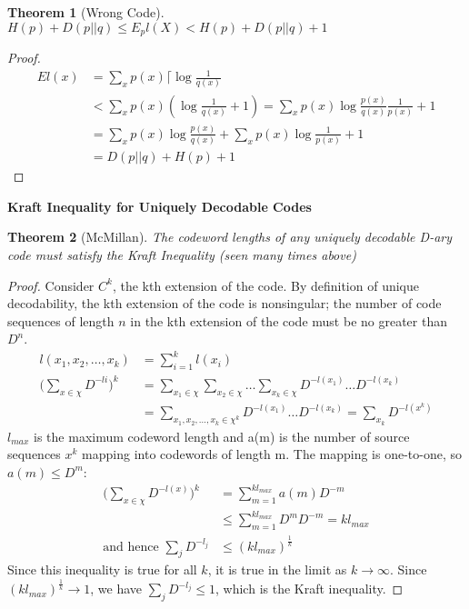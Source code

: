 \documentclass[10pt]{article}
\newtheorem{thm}{Theorem}[section]
\begin{document}
\begin{tiny}
\begin{multicols}{3}
\begin{thm}[Wrong Code]
        $H(p)+D(p||q) \leq E_pl(X)<H(p)+D(p||q)+1$
    \end{thm}
    \begin{proof}
        \begin{align*}
            El(x) &= \sum_x p(x) \lceil\log \frac{1}{q(x)} \\
            &< \sum_x p(x) (\log \frac{1}{q(x)} + 1) = \sum_x p(x) \log \frac{p(x)}{q(x)} \frac{1}{p(x)} + 1 \\
&= \sum_x p(x) \log \frac{p(x)}{q(x)} + \sum_x p(x) \log \frac{1}{p(x)} + 1 \\
&= D(p||q) + H(p) + 1
\end{align*}
\end{proof}




\textbf{\scriptsize Kraft Inequality for Uniquely Decodable Codes}
\begin{thm}[McMillan] \label{thm: mcmillan}
The codeword lengths of any uniquely decodable D-ary code must satisfy the Kraft Inequality (seen many times above) 
\end{thm}
\begin{proof}
Consider ${C^{k}}$, the kth extension of the code. By definition of unique decodability, the kth extension of the code is nonsingular; 
the number of code sequences of length ${n}$ in the kth extension of the code must be no greater than ${D^{n}}$. 
\begin{align}
l({x_1},{x_2}, \ldots , {x_k}) &= \sum_{i=1}^{k} l({x_i})\\
\bigg(\sum_{x\in \chi} D^{-li}\bigg)^{k} &=
\sum_{x_1\in\chi}\sum_{x_2\in\chi} \ldots \sum_{x_k\in\chi}  D^{-l({x_1})} \ldots D^{-l({x_k})}\\
&=\sum_{{x_1},{x_2}, \ldots , {x_k} \in \chi^{k}}  D^{-l({x_1})}\ldots D^{-l({x_k})} 
=\sum_{x_k} D^{-l({x^{k}})}
\end{align}
${l_{max}}$ is the maximum codeword length and a(m) is the number of source sequences
${x^{k}}$ mapping into codewords of length m. The mapping is one-to-one, so $a(m) \leq D^{m}$:
\begin{align}
\bigg(\sum_{x\in\chi} D^{-l(x)}\bigg)^{k} &= \sum_{m=1}^{kl_{max}} a(m)D^{-m}\\
&\leq \sum_{m=1}^{kl_{max}} D^{m}D^{-m} = kl_{max}\\
\text{and hence } \sum_j D^{-l_j} &\leq (kl_{max})^{\frac{1}{k}}
\end{align}
Since this inequality is true for all ${k}$, it is true in the limit as ${k} \rightarrow \infty$.
Since ${(kl_{max})^{\frac{1}{k}}} \rightarrow 1$, we have 
$\sum_j D^{-l_j} \leq 1$, which is the Kraft inequality.
\end{proof}


\end{multicols}
\end{tiny}
\end{document}
